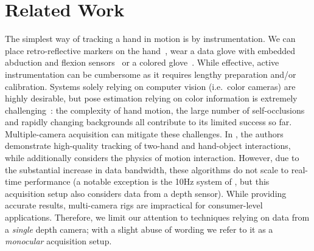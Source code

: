 



\section{Related Work}
\label{sec:related}

The simplest way of tracking a hand in motion is by instrumentation. We can place retro-reflective markers on the hand~\cite{zhao2012marker}, wear a data glove with embedded abduction and flexion sensors~\cite{dipietro2008survey} or a colored glove~\cite{wang2009colorglove}. While effective, active instrumentation can be cumbersome as it requires lengthy preparation and/or calibration. Systems solely relying on computer vision (i.e.\ color cameras) are highly desirable, but pose estimation  relying on color information is extremely challenging~\cite{erol2007survey}: the complexity of hand motion, the large number of self-occlusions and rapidly changing backgrounds all contribute to its limited success so far. Multiple-camera acquisition can mitigate these challenges. In \cite{ballan2013salient}, the authors demonstrate high-quality tracking of two-hand and hand-object interactions, while \cite{wang2013physics} additionally considers the physics of motion interaction. However, due to the substantial increase in data bandwidth, these algorithms do not scale to real-time performance (a notable exception is the 10Hz system of  \cite{sridhar2013multicam}, but this acquisition setup also considers data from a depth sensor). While providing accurate results, multi-camera rigs are  impractical for consumer-level applications. Therefore, we limit our attention to techniques relying on data from a \emph{single} depth camera; with a slight abuse of wording we refer to it as a \emph{monocular} acquisition setup.

